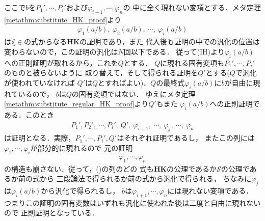 \begin{metaprf}
\begin{description}
				ここで$b$を$P_{1}',\cdots,P_{i}'$および$\varphi_{i+1},\cdots,\varphi_{n}$の
				中に全く現れない変項とする．メタ定理\ref{metathm:substitute_HK_proof}より
				\begin{align}
					\varphi_{1}(a/b),\ \varphi_{2}(a/b),\ \cdots,\ \varphi_{i}(a/b)
				\end{align}
				は$\lang{\in}$の式からなる{\bf HK}の証明であり，また
				代入後も証明の中での汎化の位置は変わらないので，この証明の汎化は$N$回以下である．
				従って(IH)より$\varphi_{i}(a/b)$への正則証明が取れるから，これを$Q$とする．
				$Q$に現れる固有変項も$P_{1}',\cdots,P_{i}'$のものと被らないように
				取り替えて，そして得られる証明を$Q'$とする($Q$で汎化が使われていなければ
				$Q'$は$Q$とすればよい)．$Q$の最終式$\varphi_{i}(a/b)$に$b$が自由に現れているので，
				$b$は$Q$の固有変項ではない．
				ゆえにメタ定理\ref{metathm:substitute_regular_HK_proof}より$Q'$もまた
				$\varphi_{i}(a/b)$への正則証明である．このとき
				\begin{align}
					P_{1}',P_{2}',\ \cdots,P_{i}',\ Q',\ \varphi_{i+1},\ 
					\cdots,\ \varphi_{j},\ \cdots,\ \varphi_{n}
					\label{seq:regularization_of_HK_proof_1}
				\end{align}
				は証明となる．実際，$P_{1}',\cdots,P_{i}',Q'$はそれぞれ証明であるし，
				またこの列には$\varphi_{1},\cdots,\varphi_{i}$が部分的に現れるので
				元の証明
				\begin{align}
					\varphi_{1},\cdots,\varphi_{n}
				\end{align}
				の構造も崩さない．従って，()の列のどの
				式も{\bf HK}の公理であるか$\mathscr{S}$の公理であるか前の式から
				三段論法で得られるか前の式から汎化で得られる，
				ちなみに$\varphi_{j}$は$\varphi_{i}(a/b)$から汎化で得られるし，
				$b$は$\varphi_{i+1},\cdots,\varphi_{n}$には現れない変項である．
				つまりこの証明の固有変数はいずれも汎化に使われた後は二度と自由に現れないので
				正則証明となっている．
				\QED
		\end{description}
	\end{metaprf}
	
